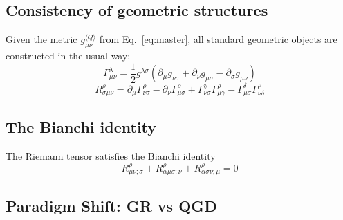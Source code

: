 \documentclass[11pt,a4paper]{article}
\theoremstyle{definition}
\theoremstyle{remark}
\begin{document}
	\subsection{Consistency of geometric structures}
	
	Given the metric $g_{\mu\nu}^{\langle Q \rangle}$ from Eq.~\eqref{eq:master}, all standard geometric objects are constructed in the usual way:
	\begin{equation}
		\Gamma^\lambda_{\mu\nu} = \frac{1}{2}g^{\lambda\sigma}\left(\partial_\mu g_{\nu\sigma} + \partial_\nu g_{\mu\sigma} - \partial_\sigma g_{\mu\nu}\right)
		\label{eq:christoffel}
	\end{equation}
	\begin{equation}
		R^\rho_{\sigma\mu\nu} = \partial_\mu \Gamma^\rho_{\nu\sigma} - \partial_\nu \Gamma^\rho_{\mu\sigma} + \Gamma^\gamma_{\nu\sigma}\Gamma^\rho_{\mu\gamma} - \Gamma^\delta_{\mu\sigma}\Gamma^\rho_{\nu\delta}
		\label{eq:riemann}
	\end{equation}
	
	\subsection{The Bianchi identity}
	
	The Riemann tensor satisfies the Bianchi identity
	\begin{equation}
		R^\rho_{\mu\nu;\sigma} + R^\rho_{\alpha\mu\sigma;\nu} + R^\rho_{\alpha\sigma\nu;\mu} = 0
		\label{eq:bianchi}
	\end{equation}
	
	\subsection{Paradigm Shift: GR vs QGD}
	
\end{document}
